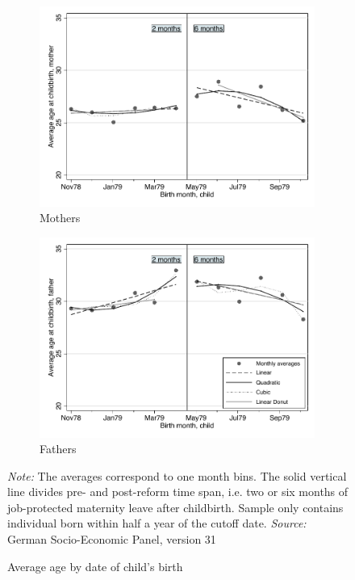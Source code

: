 \documentclass[a4paper ]{article}
\begin{document}
\begin{figure}[h]
	\centering
	\begin{subfigure}[h]{0.48\textwidth}
		\centering
		\includegraphics[width=0.99\textwidth]{../../analysis/graphs/SOEP/Magebirth2_treated}
		\caption{Mothers}		
	\end{subfigure}
	\quad
	\begin{subfigure}[h]{0.48\textwidth}
		\centering
		\includegraphics[width=0.99\textwidth]{../../analysis/graphs/SOEP/Fagebirth2_treated}
		\caption{Fathers}
	\end{subfigure}
	\caption{Average age by date of child's birth}\label{fig:age_birth_treatment cohort}
	\begin{minipage}{\textwidth} %
{\footnotesize \textit{Note:} The averages correspond to one month bins. The solid vertical line divides pre- and post-reform time span, i.e. two or six months of job-protected maternity leave after childbirth. Sample only contains individual born within half a year of the cutoff date. \newline \textit{Source: }German Socio-Economic Panel, version 31\par}
\end{minipage}
\end{figure}
\vspace*{\fill}
\end{document}
